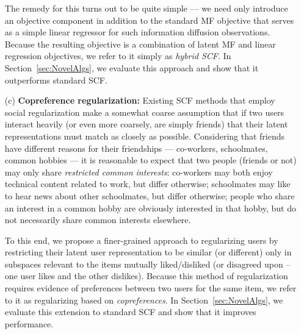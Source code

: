 \documentclass{sig-alternate}
\begin{document}
\begin{enumerate}
The remedy for
this turns out to be quite simple --- we need only introduce an
objective component in addition to the standard MF objective that
serves as a simple linear regressor for such information diffusion
observations.  Because the resulting objective is a combination of
latent MF and linear regression objectives, we refer to it simply as
\emph{hybrid SCF}.  In Section~\ref{sec:NovelAlgs}, we evaluate this
approach and show that it outperforms standard SCF.
\item[(c)] {\bf Copreference regularization:} Existing SCF methods
that employ social regularization make a somewhat coarse assumption
that if two users interact heavily (or even more coarsely, are simply friends)
that their latent representations must match as closely as possible.
Considering that friends have different reasons for their friendships
--- co-workers, schoolmates, common hobbies --- it is reasonable to
expect that two people (friends or not) may only share
\emph{restricted common interests}: co-workers may both enjoy
technical content related to work, but differ otherwise; schoolmates
may like to hear news about other schoolmates, but differ otherwise;
people who share an interest in a common hobby are obviously
interested in that hobby, but do not necessarily share common
interests elsewhere.  

To this end, we propose a finer-grained approach
to regularizing users by restricting their latent user representation
to be similar (or different) only in subspaces relevant to the items
mutually liked/disliked (or disagreed upon -- one user likes and the
other dislikes).  Because this method of regularization requires
evidence of preferences between two users for the same item, we refer
to it as regularizing based on \emph{copreferences}.
In Section~\ref{sec:NovelAlgs}, we evaluate this extension to standard
SCF and show that it improves performance.
\end{enumerate}
\end{document}
